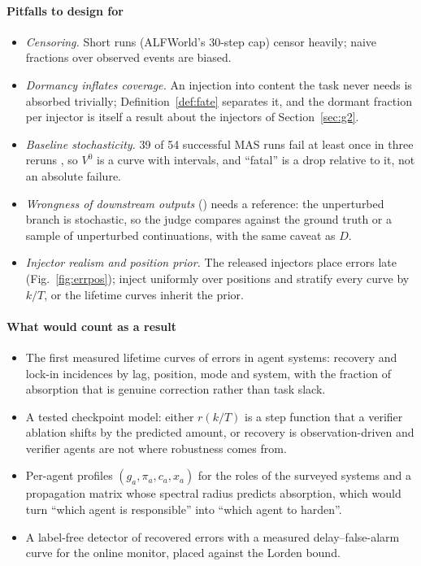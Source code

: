 \documentclass[10pt,a4paper]{article}
\begin{document}
\paragraph{Pitfalls to design for}
\begin{itemize}[leftmargin=1.1em]
\item \emph{Censoring.} Short runs (ALFWorld's 30-step cap) censor heavily; naive fractions over observed events are biased.
\item \emph{Dormancy inflates coverage.} An injection into content the task never needs is absorbed trivially; Definition~\ref{def:fate} separates it, and the dormant fraction per injector is itself a result about the injectors of Section~\ref{sec:g2}.
\item \emph{Baseline stochasticity.} 39 of 54 successful MAS runs fail at least once in three reruns \cite{luan2026symtrace}, so $V^0$ is a curve with intervals, and ``fatal'' is a drop relative to it, not an absolute failure.
\item \emph{Wrongness of downstream outputs} () needs a reference: the unperturbed branch is stochastic, so the judge compares against the ground truth or a sample of unperturbed continuations, with the same caveat as $D$.
\item \emph{Injector realism and position prior.} The released injectors place errors late (Fig.~\ref{fig:errpos}); inject uniformly over positions and stratify every curve by $k/T$, or the lifetime curves inherit the prior.
\end{itemize}

\paragraph{What would count as a result}
\begin{itemize}[leftmargin=1.1em]
\item The first measured lifetime curves of errors in agent systems: recovery and lock-in incidences by lag, position, mode and system, with the fraction of absorption that is genuine correction rather than task slack.
\item A tested checkpoint model: either $r(k/T)$ is a step function that a verifier ablation shifts by the predicted amount, or recovery is observation-driven and verifier agents are not where robustness comes from.
\item Per-agent profiles $(g_a,\pi_a,c_a,x_a)$ for the roles of the surveyed systems and a propagation matrix whose spectral radius predicts absorption, which would turn ``which agent is responsible'' into ``which agent to harden''.
\item A label-free detector of recovered errors with a measured delay--false-alarm curve for the online monitor, placed against the Lorden bound.
\end{itemize}

\clearpage

\end{document}
